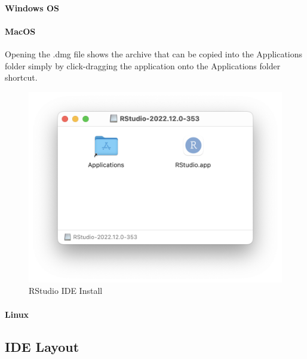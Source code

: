 \documentclass[
]{book}
\begin{document}
\hypertarget{windows-os-1}{%
\paragraph*{Windows OS}\label{windows-os-1}}

\hypertarget{macos-1}{%
\paragraph*{MacOS}\label{macos-1}}

Opening the .dmg file shows the archive that can be copied into the Applications folder simply by click-dragging the application onto the Applications folder shortcut.

\begin{figure}
\includegraphics[width=13.58in]{images/02_011_rstudio_installer_mac} \caption{\label{fig:2011}RStudio IDE Install}\label{fig:2011}
\end{figure}

\hypertarget{linux-1}{%
\paragraph*{Linux}\label{linux-1}}

\hypertarget{ide-layout}{%
\subsection{IDE Layout}\label{ide-layout}}
\end{document}
